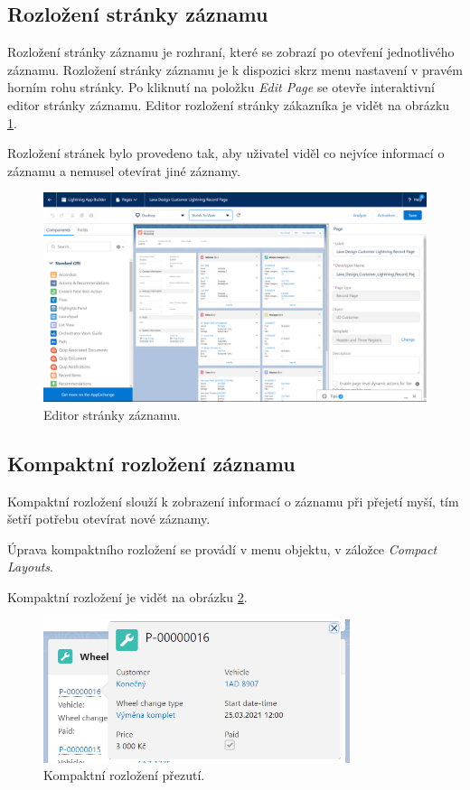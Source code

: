 \subsection{Rozložení stránky záznamu}
Rozložení stránky záznamu je rozhraní, které se zobrazí po otevření jednotlivého záznamu. Rozložení stránky záznamu je k dispozici skrz menu nastavení v pravém horním rohu stránky. Po kliknutí na položku \emph{Edit Page} se otevře interaktivní editor stránky záznamu.
Editor rozložení stránky zákazníka je vidět na obrázku \ref{fig:LD_Customer_Page Builder}.

Rozložení stránek bylo provedeno tak, aby uživatel viděl co nejvíce informací o záznamu a nemusel otevírat jiné záznamy.
\begin{figure}[h!]
    \centering
    \includegraphics[width=\textwidth]{assets/7_implementace/uživatelské_rozhraní/Page builder - LD Customer.png}
    \caption{Editor stránky záznamu.}
    \label{fig:LD_Customer_Page Builder}
\end{figure}
\FloatBarrier
\subsection{Kompaktní rozložení záznamu}
Kompaktní rozložení slouží k zobrazení informací o záznamu při přejetí myší, tím šetří potřebu otevírat nové záznamy.

Úprava kompaktního rozložení se provádí v menu objektu, v záložce \emph{Compact Layouts}. 

Kompaktní rozložení je vidět na obrázku \ref{fig:wheel_change_compact_layout}.
\begin{figure}[h!]
    \centering
    \includegraphics[width=0.8\textwidth]{assets/7_implementace/uživatelské_rozhraní/Wheel change detail.png}
    \caption{Kompaktní rozložení přezutí.}
    \label{fig:wheel_change_compact_layout}
\end{figure}
\FloatBarrier
